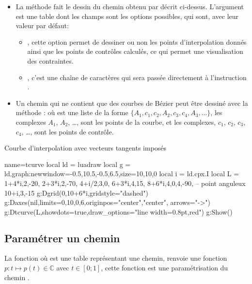 \begin{itemize}
Deux points consécutifs seront reliés par une courbe de Bézier, la fonction calcule les points de contrôle pour avoir les vecteurs tangents souhaités.

\item La méthode  fait le dessin du chemin obtenu par  décrit ci-dessus. L'argument  est une table dont les champs sont les options possibles, qui sont, avec leur valeur par défaut:
    \begin{itemize}
        \item {}, cette option permet de dessiner ou non les points d'interpolation donnés ainsi que les points de contrôles calculés, ce qui permet une visualisation des contraintes.
        \item {}, c'est une chaîne de caractères qui sera passée directement à l'instruction \drawcmd.
    \end{itemize}
    
\item Un chemin qui ne contient que des courbes de Bézier peut être dessiné avec la méthode : 
où  est une liste de la forme $\{A_1,c_1,c_2,A_2,c_3,c_4,A_3,\ldots\}$, les complexes $A_1$, $A_2$, \ldots, sont les points de la courbe, et les complexes, $c_1$, $c_2$, $c_3$, $c_4$, \ldots, sont les points de contrôle.

\end{itemize}

\begin{demo}{Courbe d'interpolation avec vecteurs tangents imposés}
\begin{luadraw}{name=tcurve}
local ld = luadraw
local g = ld.graph:new{window={-0.5,10.5,-0.5,6.5},size={10,10,0}}
local i = ld.cpx.I
local L = {
1+4*i,{2,-20},
2+3*i,{2,-70},
4+i/2,{3,0},
6+3*i,{4,15},
8+6*i,{4,0,4,-90}, -- point anguleux
10+i,{3,-15}}
g:Dgrid({0,10+6*i},{gridstyle="dashed"})
g:Daxes(nil,{limits={{0,10},{0,6}},originpos={"center","center"}, arrows="->"})
g:Dtcurve(L,{showdots=true,draw_options="line width=0.8pt,red"})
g:Show()
\end{luadraw}
\end{demo}

\subsection{Paramétrer un chemin}

La fonction  où  est une table représentant une chemin, renvoie une fonction $p\colon t \mapsto p(t)\in \mathbb C$ avec $t\in[0;1]$, cette fonction est une paramétrisation du chemin .
    

